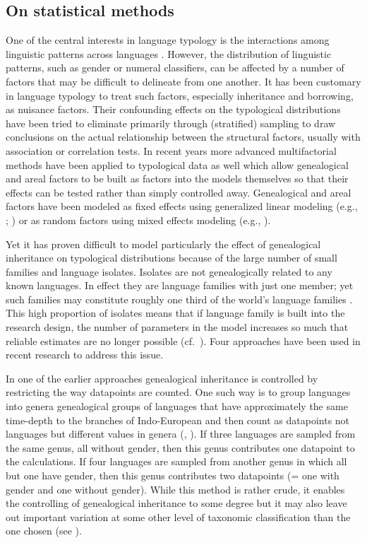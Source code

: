 \documentclass[output=collectionpaper]{langsci/langscibook}
\begin{document}
\subsection{On statistical methods}
\label{sec:Sinne:3.2}

One of the central interests in language typology is the interactions among linguistic patterns across languages \citep{Bickel2007a}. However, the distribution of linguistic patterns, such as gender or numeral classifiers, can be affected by a number of factors that may be difficult to delineate from one another. It has been customary in language typology to treat such factors, especially inheritance and borrowing, as nuisance factors. Their confounding effects on the typological distributions have been tried to eliminate primarily through (stratified) sampling to draw conclusions on the actual relationship between the structural factors, usually with association or correlation tests. In recent years more advanced multifactorial methods have been applied to typological data as well which allow genealogical and areal factors to be built as factors into the models themselves so that their effects can be tested rather than simply controlled away. Genealogical and areal factors have been modeled as fixed effects using generalized linear modeling (e.g., \citealt{Cysouw2010}; \citealt{Sinnemaeki2010}) or as random factors using mixed effects modeling (e.g., \citealt{Bentz2013}).

Yet it has proven difficult to model particularly the effect of genealogical inheritance on typological distributions because of the large number of small families and language isolates. Isolates are not genealogically related to any known languages. In effect they are language families with just one member; yet such families may constitute roughly one third of the world's language families \citep{Campbell2016}. This high proportion of isolates means that if language family is built into the research design, the number of parameters in the model increases so much that reliable estimates are no longer possible (cf.\ \citealt[877--880]{Sinnemaeki2010}). Four approaches have been used in recent research to address this issue.

In one of the earlier approaches genealogical inheritance is controlled by restricting the way datapoints are counted. One such way is to group languages into genera \textendash{} genealogical groups of languages that have approximately the same time-depth to the branches of Indo-European \textendash{} and then count as datapoints not languages but different values in genera (\citealt{Dryer1992}, \citealt*{Dryer2000}). If three languages are sampled from the same genus, all without gender, then this genus contributes one datapoint to the calculations. If four languages are sampled from another genus in which all but one have gender, then this genus contributes two datapoints (= one with gender and one without gender). While this method is rather crude, it enables the controlling of genealogical inheritance to some degree but it may also leave out important variation at some other level of taxonomic classification than the one chosen (see \citealt{Bickel2008}).
\end{document}

